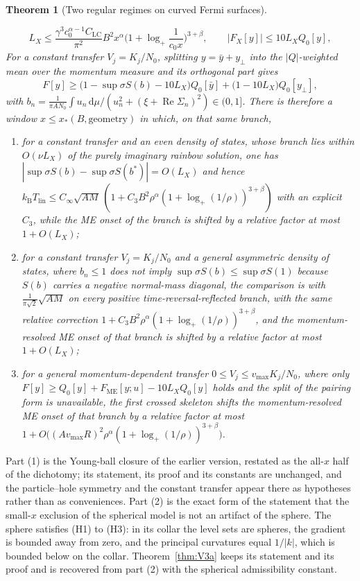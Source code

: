 \documentclass[11pt]{article}
\newcommand{\Cinf}{C_\infty}
\newcommand{\kB}{k_{\mathrm B}}
\newcommand{\Tlin}{T_{\mathrm{lin}}}
\newcommand{\dd}{\,\mathrm d}
\newcommand{\sS}{\sup\sigma S}
\newcommand{\CLC}{C_{\mathrm{LC}}}
\newcommand{\vmax}{v_{\max}}
\newtheorem{theorem}{Theorem}[section]
\theoremstyle{definition}
\theoremstyle{remark}
\begin{document}
\begin{theorem}[Two regular regimes on curved Fermi surfaces]
\begin{enumerate}
\begin{equation}\label{eq:curvedLX}
L_X\le\frac{\gamma^3c_0^{\alpha-1}\CLC}{\pi^2}B^2x^{\alpha}\Big(1+\log_+\frac{1}{c_0x}\Big)^{3+\beta},\qquad |F_X[y]|\le10L_XQ_0[y],
\end{equation}
For a constant transfer $V_j=K_j/N_0$, splitting $y=\bar y+y_\perp$ into the $|Q|$-weighted mean over the momentum measure and its orthogonal part gives
\begin{equation}\label{eq:curvedF}
F[y]\ge\big(1-\sS(b)-10L_X\big)Q_0[\bar y]+\big(1-10L_X\big)Q_0[y_\perp],
\end{equation}
with $b_n=\frac{1}{\pi AN_0}\int u_n\dd\mu/(u_n^2+(\xi+\operatorname{Re}\Sigma_n)^2)\in(0,1]$. There is therefore a window $x\le x_*(B,\text{geometry})$ in which, on that same branch,
\begin{enumerate}
\item[(i)] for a constant transfer and an even density of states, whose branch lies within $O(\nu L_X)$ of the purely imaginary rainbow solution, one has $|{\sS(b)-\sS(b^*)}|=O(L_X)$ and hence $\kB\Tlin\le\Cinf\sqrt{AM}\,(1+C_3B^2\rho^{\alpha}(1+\log_+(1/\rho))^{3+\beta})$ with an explicit $C_3$, while the ME onset of the branch is shifted by a relative factor at most $1+O(L_X)$;
\item[(ii)] for a constant transfer $V_j=K_j/N_0$ and a general asymmetric density of states, where $b_n\le1$ does not imply $\sS(b)\le\sS(1)$ because $S(b)$ carries a negative normal-mass diagonal, the comparison is with $\frac{1}{\pi\sqrt2}\sqrt{AM}$ on every positive time-reversal-reflected branch, with the same relative correction $1+C_3B^2\rho^\alpha(1+\log_+(1/\rho))^{3+\beta}$, and the momentum-resolved ME onset of that branch is shifted by a relative factor at most $1+O(L_X)$;
\item[(iii)] for a general momentum-dependent transfer $0\le V_j\le\vmax K_j/N_0$, where only $F[y]\ge Q_0[y]+F_{\mathrm{ME}}[y;u]-10L_XQ_0[y]$ holds and the split of the pairing form is unavailable, the first crossed skeleton shifts the momentum-resolved ME onset of that branch by a relative factor at most $1+O\big((A\vmax R)^2\rho^{\alpha}(1+\log_+(1/\rho))^{3+\beta}\big)$.
\end{enumerate}
\end{enumerate}
\end{theorem}

Part (1) is the Young-ball closure of the earlier version, restated as the all-$x$ half of the dichotomy; its statement, its proof and its constants are unchanged, and the particle--hole symmetry and the constant transfer appear there as hypotheses rather than as conveniences. Part (2) is the exact form of the statement that the small-$x$ exclusion of the spherical model is not an artifact of the sphere. The sphere satisfies (H1) to (H3): in its collar the level sets are spheres, the gradient is bounded away from zero, and the principal curvatures equal $1/|k|$, which is bounded below on the collar. Theorem~\ref{thm:V3a} keeps its statement and its proof and is recovered from part (2) with the spherical admissibility constant.
\end{document}
